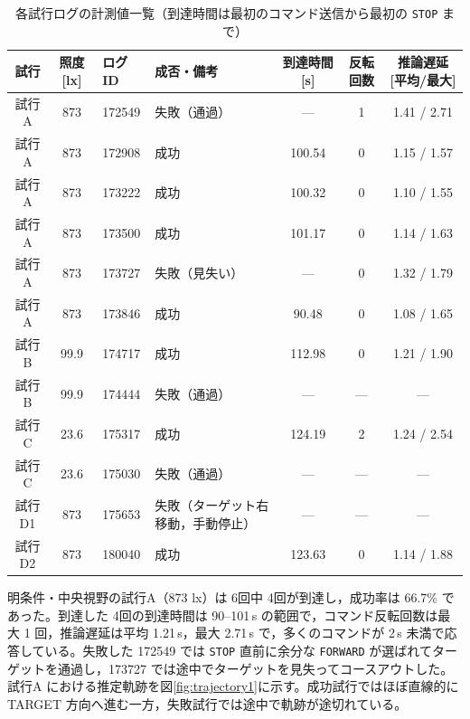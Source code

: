 \documentclass[a4paper,11pt]{ltjsreport}
\begin{document}
\begin{table}[htbp]
  \centering
  \caption{各試行ログの計測値一覧（到達時間は最初のコマンド送信から最初の \texttt{STOP} まで）}
  \label{tab:summary}
  \footnotesize
  \setlength{\tabcolsep}{2.5pt}
  \setlength{\arrayrulewidth}{0.5pt}
  \renewcommand{\arraystretch}{1.1}
  \noindent\begin{tabularx}{\linewidth}{|c|c|l|X|c|c|c|}
    \hline
    試行 & 照度 [lx] & ログID & 成否・備考 & 到達時間 [s] & 反転回数 & 推論遅延[平均/最大] \\
    \hline
    試行A & 873 & 172549 & 失敗（通過） & --- & 1 & 1.41 / 2.71 \\
    試行A & 873 & 172908 & 成功 & 100.54 & 0 & 1.15 / 1.57 \\
    試行A & 873 & 173222 & 成功 & 100.32 & 0 & 1.10 / 1.55 \\
    試行A & 873 & 173500 & 成功 & 101.17 & 0 & 1.14 / 1.63 \\
    試行A & 873 & 173727 & 失敗（見失い） & ---  & 0 & 1.32 / 1.79 \\
    試行A & 873 & 173846 & 成功 & 90.48  & 0 & 1.08 / 1.65 \\
    \hline
    試行B & 99.9 & 174717 & 成功 & 112.98 & 0 & 1.21 / 1.90 \\
    試行B & 99.9 & 174444 & 失敗（通過） & --- & --- & --- \\
    \hline
    試行C & 23.6 & 175317 & 成功 & 124.19 & 2 & 1.24 / 2.54 \\
    試行C & 23.6 & 175030 & 失敗（通過） & --- & --- & --- \\
    \hline
    試行D1 & 873 & 175653 & 失敗（ターゲット右移動，手動停止） & --- & --- & --- \\
    \hline
    試行D2 & 873 & 180040 & 成功 & 123.63 & 0 & 1.14 / 1.88 \\
    \hline
  \end{tabularx}
\end{table}

明条件・中央視野の試行A（873 lx）は 6回中 4回が到達し，成功率は 66.7\% であった。到達した 4回の到達時間は 90--101\,s の範囲で，コマンド反転回数は最大 1 回，推論遅延は平均 1.21\,s，最大 2.71\,s で，多くのコマンドが 2\,s 未満で応答している。失敗した 172549 では \texttt{STOP} 直前に余分な \texttt{FORWARD} が選ばれてターゲットを通過し，173727 では途中でターゲットを見失ってコースアウトした。試行A における推定軌跡を図\ref{fig:trajectory1}に示す。成功試行ではほぼ直線的に TARGET 方向へ進む一方，失敗試行では途中で軌跡が途切れている。
\end{document}
